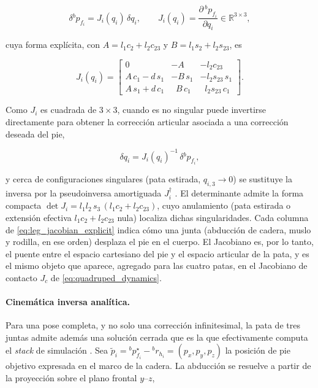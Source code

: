 \documentclass[12pt,a4paper]{report}
\begin{document}
\begin{equation}
\delta {}^{b}\!p_{f_i} = J_i(q_i)\,\delta q_i,
\qquad
J_i(q_i) = \frac{\partial\, {}^{b}\!p_{f_i}}{\partial q_i} \in \mathbb{R}^{3\times 3},
\label{eq:leg_jacobian}
\end{equation}

cuya forma explícita, con \(A = l_1 c_2 + l_2 c_{23}\) y
\(B = l_1 s_2 + l_2 s_{23}\), es

\begin{equation}
J_i(q_i) =
\begin{bmatrix}
0 & -A & -l_2 c_{23} \\[2pt]
A\,c_1 - d\,s_1 & -B\,s_1 & -l_2 s_{23}\,s_1 \\[2pt]
A\,s_1 + d\,c_1 & \;\;B\,c_1 & \;\;l_2 s_{23}\,c_1
\end{bmatrix}.
\label{eq:leg_jacobian_explicit}
\end{equation}

Como \(J_i\) es cuadrada de \(3\times 3\), cuando es no singular puede invertirse
directamente para obtener la corrección articular asociada a una corrección
deseada del pie,

\begin{equation}
\delta q_i = J_i(q_i)^{-1}\,\delta {}^{b}\!p_{f_i},
\label{eq:leg_inverse_differential_kinematics}
\end{equation}

y cerca de configuraciones singulares (pata estirada, \(q_{i,3}\to 0\)) se
sustituye la inversa por la pseudoinversa amortiguada
\(J_i^{\dagger}\) \citep{Siciliano2009,Lee2013Cheetah}. El determinante admite
la forma compacta \(\det J_i = l_1 l_2\, s_3\,(l_1 c_2 + l_2 c_{23})\), cuyo
anulamiento (pata estirada o extensión efectiva \(l_1 c_2 + l_2 c_{23}\)
nula) localiza dichas singularidades. Cada columna de
\eqref{eq:leg_jacobian_explicit} indica cómo una junta (abducción de cadera,
muslo y rodilla, en ese orden) desplaza el pie en el cuerpo. El Jacobiano es, por
lo tanto, el puente entre el espacio cartesiano del pie y el espacio articular de
la pata, y es el mismo objeto que aparece, agregado para las cuatro patas, en el
Jacobiano de contacto \(J_c\) de \eqref{eq:quadruped_dynamics}.

\paragraph{Cinemática inversa analítica.}
Para una pose completa, y no solo una corrección infinitesimal, la pata de tres
juntas admite además una solución cerrada que es la que efectivamente computa el
\emph{stack} de simulación \citep{UnitreeGo2ROS2,CHAMP}. Sea
\(\tilde p_i = {}^{b}\!p_{f_i}^{\star} - {}^{b}r_{h_i} = (p_x, p_y, p_z)\) la
posición de pie objetivo expresada en el marco de la cadera. La abducción se
resuelve a partir de la proyección sobre el plano frontal \(y\)--\(z\),
\end{document}
